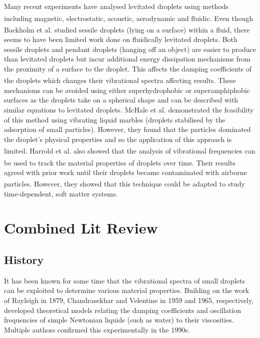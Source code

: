 \documentclass{physics_article_B}
\begin{document}
Many recent experiments have analysed levitated droplets using methods including magnetic\textsuperscript{\cite{hill}}, electrostatic\textsuperscript{\cite{mugele}}, acoustic\textsuperscript{\cite{trinh}}, aerodynamic\textsuperscript{\cite{benmore}} and fluidic\textsuperscript{\cite{backholm}}. Even though Backholm et al. studied sessile droplets (lying on a surface) within a fluid\textsuperscript{\cite{backholm}}, there seems to have been limited work done on fluidically levitated droplets. Both sessile droplets and pendant droplets (hanging off an object) are easier to produce than levitated droplets but incur additional energy dissipation mechanisms from the proximity of a surface to the droplet. This affects the damping coefficients of the droplets which changes their vibrational spectra  affecting results\textsuperscript{\cite{sharp}}. These mechanisms can be avoided using either superhydrophobic or superamphiphobic surfaces as the droplets take on a spherical shape and can be described with similar equations to levitated droplets. McHale et al. demonstrated the feasibility of this method using vibrating liquid marbles (droplets stabilised by the adsorption of small particles). However, they found that the particles dominated the droplet's physical properties and so the application of this approach is limited\textsuperscript{\cite{mchale}}.  Harrold et al. also showed that the analysis of vibrational frequencies can be used to track the material properties of droplets over time\textsuperscript{\cite{harrold2}}. Their results agreed with prior work until their droplets became contaminated with airborne particles\textsuperscript{\cite{harrold2}}. However, they showed that this technique could be adapted to study time-dependent, soft matter systems.

\section{Combined Lit Review\label{sect:theory}}

\subsection{History}
It has been known for some time that the vibrational spectra of small droplets can be exploited to determine various material properties. Building on the work\cite{rayleigh1879capillary} of Rayleigh in 1879, Chandrasekhar and Velentine in 1959\cite{chandrasekhar1959oscillations} and 1965\cite{velentine1965motion}, respectively, developed theoretical models relating the damping coefficients and oscillation frequencies of simple Newtonian liquids (such as water) to their viscosities. Multiple authors confirmed this experimentally in the 1990s\cite{egry1998viscosity,meier2000surface}. \\
\end{document}
